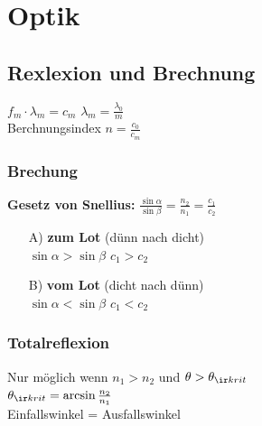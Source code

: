 \documentclass[german]{latex4ei/latex4ei_sheet}
\begin{document}
\section{Optik}

\begin{sectionbox}
\subsection{Rexlexion und Brechnung}
$f_m \cdot \lambda_m = c_m$ \qquad
$\lambda_m = \frac{\lambda_0}{m}$\\
Berchnungsindex $n=\frac{c_0}{c_m}$
\subsubsection{Brechung}
\begin{emphbox}
\textbf{Gesetz von Snellius:}
$\frac{\sin \alpha}{\sin \beta} = \frac{n_2}{n_1} = \frac {c_1}{c_2}$
\end{emphbox}
\begin{enumerate}
\item[A)] \textbf{zum Lot} (dünn nach dicht)\\
$\sin \alpha > \sin \beta$ \qquad $c_1 > c_2$
\item[B)] \textbf{vom Lot} (dicht nach dünn)\\
$\sin \alpha < \sin \beta$ \qquad $c_1 < c_2$
\end{enumerate}
\subsubsection{Totalreflexion}
Nur möglich wenn $n_1 > n_2$ und $\theta > \theta_{\ir krit}$ \\
$\theta_{\ir krit} = \arcsin \frac{n_2}{n_1}$\\
Einfallswinkel = Ausfallswinkel
\end{sectionbox}
\end{document}
